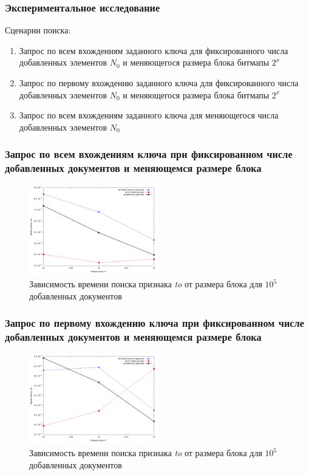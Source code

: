 \documentclass[aspectratio=169, pdf, 8pt, unicode]{beamer}
\begin{document}
\begin{frame}[fragile]
    \frametitle{Экспериментальное исследование}
{\large Сценарии поиска:}
    \vspace{4mm}
\begin{enumerate}
    \item Запрос по всем вхождениям заданного ключа для фиксированного числа
    добавленных элементов $N_0$ и меняющегося размера блока битмапы $2^{x}$
    \vspace{4mm}
    \item Запрос по первому вхождению заданного ключа для фиксированного числа
    добавленных элементов $N_0$ и меняющегося размера блока битмапы $2^{x}$
    \vspace{4mm}
    \item Запрос по всем вхождениям заданного ключа для меняющегося числа добавленных
    элементов $N_0$
\end{enumerate}
\end{frame}

\begin{frame}[fragile]
\frametitle{Запрос по всем вхождениям ключа при фиксированном числе добавленных
документов и меняющемся размере блока}
\begin{figure}[H]
\centering
\includegraphics[width=0.5\textwidth]{fig/limit_1e6/1e5/to.png}
\caption{Зависимость времени поиска признака \textit{to} от размера блока для $10^5$ добавленных документов}
\end{figure}
\end{frame}

\begin{frame}[fragile]
\frametitle{Запрос по первому вхождению ключа при фиксированном числе
добавленных документов и меняющемся размере блока}
\begin{figure}[H]
\centering
\includegraphics[width=0.5\textwidth]{fig/limit_1/1e5/to.png}
\caption{Зависимость времени поиска признака \textit{to} от размера блока для $10^5$ добавленных документов}
\end{figure}
\end{frame}
\end{document}
